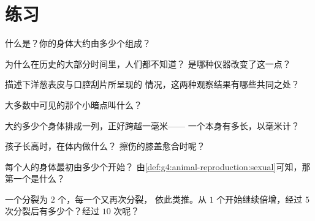 \section{练习}

\begin{exercise}[$\star$]\label{exo:g5:first-look-at-cells:1}
什么是？你的身体大约由多少个组成？
\end{exercise}

\begin{exercise}[$\star$]\label{exo:g5:first-look-at-cells:2}
为什么在历史的大部分时间里，人们都不知道？
是哪种仪器改变了这一点？
\end{exercise}

\begin{exercise}[$\star$]\label{exo:g5:first-look-at-cells:3}
描述下洋葱表皮与口腔刮片所呈现的
情况，这两种观察结果有哪些共同之处？
\end{exercise}

\begin{exercise}[$\star$]\label{exo:g5:first-look-at-cells:4}
大多数中可见的那个小暗点叫什么？
\end{exercise}

\begin{exercise}[$\star$]\label{exo:g5:first-look-at-cells:5}
大约多少个身体排成一列，正好跨越一毫米——
一个本身有多长，以毫米计？
\end{exercise}

\begin{exercise}[$\star$]\label{exo:g5:first-look-at-cells:6}
孩子长高时，在体内做什么？
擦伤的膝盖愈合时呢？
\end{exercise}

\begin{exercise}[$\star$]\label{exo:g5:first-look-at-cells:7}
每个人的身体最初由多少个开始？
由\cref{def:g4:animal-reproduction:sexual}可知，那第一个是什么？
\end{exercise}

\begin{exercise}[$\star$]\label{exo:g5:first-look-at-cells:8}
一个分裂为 $2$ 个，每一个又再次分裂，
依此类推。从 $1$ 个开始继续倍增，经过
$5$ 次分裂后有多少个？经过 $10$ 次呢？
\end{exercise}

